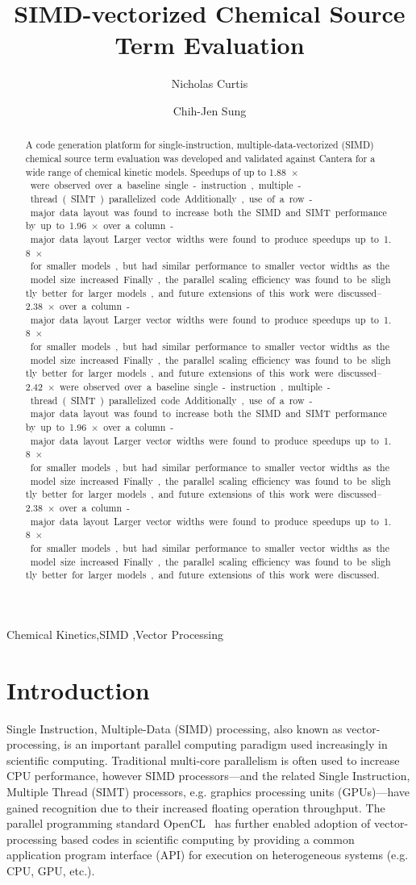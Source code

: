 \documentclass[12pt]{ussci}
\title{SIMD-vectorized Chemical Source Term Evaluation}
\author[1,*]{Nicholas Curtis}
\author[1]{Chih-Jen Sung}
\affil[1]{Department of Mechanical Engineering, University of Connecticut, Storrs, CT 06269, USA}
\affil[*]{Corresponding author: \email{nicholas.curtis@uconn.edu}}
\begin{document}
\maketitle

\begin{abstract} %
A code generation platform for single-instruction, multiple-data-vectorized (SIMD) chemical source term evaluation was developed and validated against Cantera for a wide range of chemical kinetic models.
Speedups of up to \SIrange{1.88}{2.42}{$\times$} were observed over a baseline single-instruction, multiple-thread (SIMT) parallelized code.
Additionally, use of a row-major data layout was found to increase both the SIMD and SIMT performance by up to \SIrange{1.96}{2.38}{$\times$} over a column-major data layout.
Larger vector widths were found to produce speedups up to \SI{1.8}{$\times$} for smaller models, but had similar performance to smaller vector widths as the model size increased.
Finally, the parallel scaling efficiency was found to be slightly better for larger models, and future extensions of this work were discussed.
\end{abstract}

\begin{keyword}
    Chemical Kinetics\sep SIMD \sep Vector Processing
\end{keyword}

\section{Introduction}
%

Single Instruction, Multiple-Data (SIMD) processing, also known as vector-processing, is an important parallel computing paradigm used increasingly in scientific computing.
Traditional multi-core parallelism is often used to increase CPU performance, however SIMD processors---and the related Single Instruction, Multiple Thread (SIMT) processors, e.g. graphics processing units (GPUs)---have gained recognition due to their increased floating operation throughput.
The parallel programming standard OpenCL~\cite{stone2010opencl} has further enabled adoption of vector-processing based codes in scientific computing by providing a common application program interface (API) for execution on heterogeneous systems (e.g. CPU, GPU, etc.).
\end{document}
